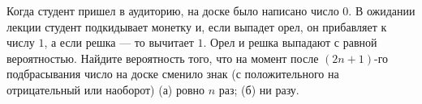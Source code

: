 \documentclass{article}
\begin{document}
Когда студент пришел в аудиторию, на доске было написано число $0$. В ожидании лекции студент
подкидывает монетку и, если выпадет орел, он прибавляет к числу $1$, а если решка --- то вычитает $1$. Орел и решка
выпадают с равной вероятностью. Найдите вероятность того, что на момент после $(2n+1)$-го подбрасывания число на доске сменило знак 
(с положительного на отрицательный или наоборот) (а) ровно $n$ раз; (б) ни разу.
\end{document}
